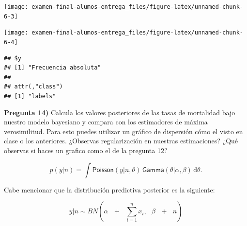 \documentclass[
]{article}
\begin{document}
\begin{center}\texttt{[image: examen-final-alumos-entrega\_files/figure-latex/unnamed-chunk-6-3]} \end{center}

\begin{center}\texttt{[image: examen-final-alumos-entrega\_files/figure-latex/unnamed-chunk-6-4]} \end{center}

\begin{verbatim}
## $y
## [1] "Frecuencia absoluta"
## 
## attr(,"class")
## [1] "labels"
\end{verbatim}

\textbf{Pregunta 14)} Calcula los valores posteriores de las tasas de
mortalidad bajo nuestro modelo bayesiano y compara con los estimadores
de máxima verosimilitud. Para esto puedes utilizar un gráfico de
dispersión cómo el visto en clase o los anteriores. ¿Observas
regularización en nuestras estimaciones? ¿Qué observas si haces un
grafico como el de la pregunta 12?

\[p(y|n) = \int \textsf{Poisson}(y | n, \theta) \, \textsf{Gamma}(\theta|\alpha, \beta) \, \text{d}\theta.\]

Cabe mencionar que la distribución predictiva posterior es la siguiente:

\[ y | n \sim BN(\alpha \text{ } + \text{ } \sum_{i=1}^nx_i, \text{ } \beta \text{ } + \text{ }n)  \]
\end{document}
